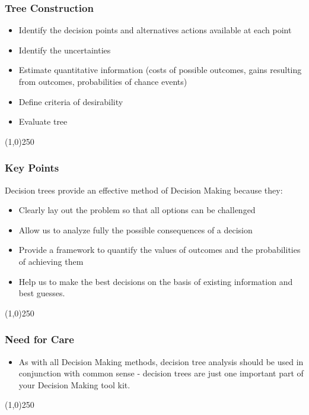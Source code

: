 \begin{frame}
\frametitle{Tree Construction}
\begin{itemize}
	\item Identify the decision points and alternatives actions available at each point
	\item Identify the uncertainties
	\item Estimate quantitative information (costs of possible outcomes, gains resulting from outcomes, probabilities of chance events)
	\item Define criteria of desirability
	\item Evaluate tree
\end{itemize}
\end{frame}\begin{center}\line(1,0){250}\end{center}






\begin{frame}
\frametitle{Key Points}
Decision trees provide an effective method of Decision Making because they:
\begin{itemize}
	\item Clearly lay out the problem so that all options can be challenged 
	\item Allow us to analyze fully the possible consequences of a decision 
	\item Provide a framework to quantify the values of outcomes and the probabilities of achieving them 
	\item Help us to make the best decisions on the basis of existing information and best guesses. 
\end{itemize}
\end{frame}\begin{center}\line(1,0){250}\end{center}







\begin{frame}
\frametitle{Need for Care}
\begin{itemize}
\item As with all Decision Making methods, decision tree analysis should be used in conjunction with common sense - decision trees are just one important part of your Decision Making tool kit. 
\end{itemize}
\end{frame}\begin{center}\line(1,0){250}\end{center}






